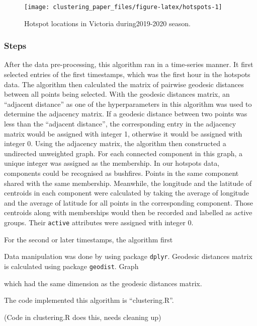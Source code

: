 \begin{Schunk}
\begin{figure}
\texttt{[image: clustering\_paper\_files/figure-latex/hotspots-1]} \caption[Hotspot locations in Victoria during2019-2020 season]{Hotspot locations in Victoria during2019-2020 season.}\label{fig:hotspots}
\end{figure}
\end{Schunk}

\hypertarget{steps}{%
\subsubsection{Steps}\label{steps}}

After the data pre-processing, this algorithm ran in a time-series
manner. It first selected entries of the first timestamps, which was the
first hour in the hotspots data. The algorithm then calculated the
matrix of pairwise geodesic distances between all points being selected.
With the geodesic distances matrix, an ``adjacent distance'' as one of
the hyperparameters in this algorithm was used to determine the
adjacency matrix. If a geodesic distance between two points was less
than the ``adjacent distance'', the corresponding entry in the adjacency
matrix would be assigned with integer 1, otherwise it would be assigned
with integer 0. Using the adjacency matrix, the algorithm then
constructed a undirected unweighted graph. For each connected component
in this graph, a unique integer was assigned as the membership. In our
hotspots data, components could be recognised as bushfires. Points in
the same component shared with the same membership. Meanwhile, the
longitude and the latitude of centroids in each component were
calculated by taking the average of longitude and the average of
latitude for all points in the corresponding component. Those centroids
along with memberships would then be recorded and labelled as active
groups. Their \texttt{active} attributes were assigned with integer 0.

For the second or later timestamps, the algorithm first

Data manipulation was done by using package \texttt{dplyr}. Geodesic
distances matrix is calculated using package \texttt{geodist}. Graph

which had the same dimension as the geodesic distances matrix.

The code implemented this algorithm is ``clustering.R''.

(Code in clustering.R does this, needs cleaning up)

